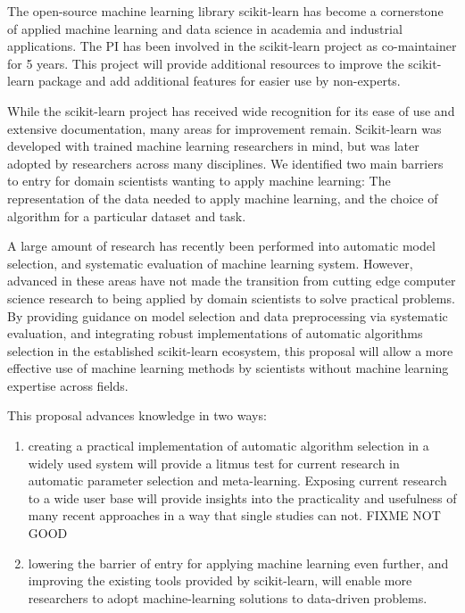 The open-source machine learning library scikit-learn has become a cornerstone of
applied machine learning and data science in academia and industrial applications.
The PI has been involved in the scikit-learn project as co-maintainer for 5 years.
This project will provide additional resources to improve the
scikit-learn package and add additional features for easier use by non-experts.

While the scikit-learn project has received wide recognition for its ease of
use and extensive documentation, many areas for improvement remain.
Scikit-learn was developed with trained machine learning researchers in mind,
but was later adopted by researchers across many disciplines.
We identified two main barriers to entry for domain scientists wanting to apply
machine learning:
The representation of the data needed to apply machine learning, and the choice
of algorithm for a particular dataset and task.

A large amount of research has recently been performed into automatic model
selection, and systematic evaluation of machine learning system.
However, advanced in these areas have not made the transition from cutting edge
computer science research to being applied by domain scientists to solve practical
problems.
By providing guidance on model selection and data preprocessing via
systematic evaluation, and integrating robust implementations of automatic
algorithms selection in the established scikit-learn ecosystem, this proposal
will allow a more effective use of machine learning methods by scientists
without machine learning expertise across fields.

This proposal advances knowledge in two ways:
\begin{enumerate}
    \item creating a practical implementation of automatic algorithm selection in a
    widely used system will provide a litmus test for current research in automatic
    parameter selection and meta-learning. Exposing current research to a wide user base
    will provide insights into the practicality and usefulness of many recent approaches
    in a way that single studies can not. FIXME NOT GOOD
    \item lowering the barrier of entry for applying machine learning even further,
    and improving the existing tools provided by scikit-learn, will enable more
    researchers to adopt machine-learning solutions to data-driven problems.
\end{enumerate}

